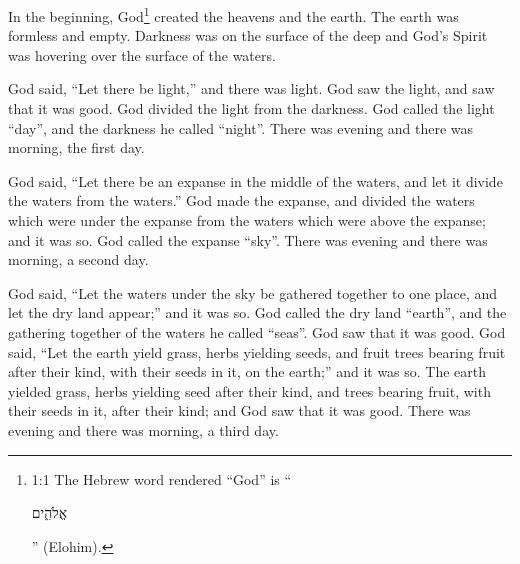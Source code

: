 {}








\vspace{-1.36in}

\mychapter{}
\myverse*{}In the beginning, God\footnote{1:1 The Hebrew word rendered “God” is “\begin{otherlanguage}{hebrew}אֱלֹהִ֑ים\end{otherlanguage}” (Elohim).} created the heavens and the earth. \myverse{}The earth was formless and empty. Darkness was on the surface of the deep and God’s Spirit was hovering over the surface of the waters.

\myverse{}God said, “Let there be light,” and there was light. \myverse{}God saw the light, and saw that it was good. God divided the light from the darkness. \myverse{}God called the light “day”, and the darkness he called “night”. There was evening and there was morning, the first day.

\myverse{}God said, “Let there be an expanse in the middle of the waters, and let it divide the waters from the waters.” \myverse{}God made the expanse, and divided the waters which were under the expanse from the waters which were above the expanse; and it was so. \myverse{}God called the expanse “sky”. There was evening and there was morning, a second day.

\myverse{}God said, “Let the waters under the sky be gathered together to one place, and let the dry land appear;” and it was so. \myverse{}God called the dry land “earth”, and the gathering together of the waters he called “seas”. God saw that it was good. \myverse{}God said, “Let the earth yield grass, herbs yielding seeds, and fruit trees bearing fruit after their kind, with their seeds in it, on the earth;” and it was so. \myverse{}The earth yielded grass, herbs yielding seed after their kind, and trees bearing fruit, with their seeds in it, after their kind; and God saw that it was good. \myverse{}There was evening and there was morning, a third day.

